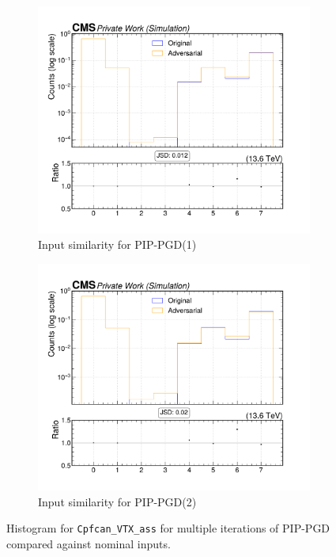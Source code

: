 \begin{figure}[htbp]
  \centering
  \begin{subfigure}[t]{0.5\textwidth}
    \includegraphics[width=\linewidth]{media/output/features/compare/combined_it_1/cmp_cpf_arr_Cpfcan_VTX_ass.pdf}
    \caption{Input similarity for PIP-PGD(1)}
    \label{fig:left}
  \end{subfigure}\hfill
  \begin{subfigure}[t]{0.5\textwidth}
    \includegraphics[width=\linewidth]{media/output/features/compare/combined_it_2/cmp_cpf_arr_Cpfcan_VTX_ass.pdf}
    \caption{Input similarity for PIP-PGD(2)}
    \label{fig:middle}
  \end{subfigure}\hfill

  \caption{Histogram for \texttt{Cpfcan\_VTX\_ass} for multiple iterations of PIP-PGD compared against nominal inputs.}
  \label{fig:combined_input_vtxAss}
\end{figure}

